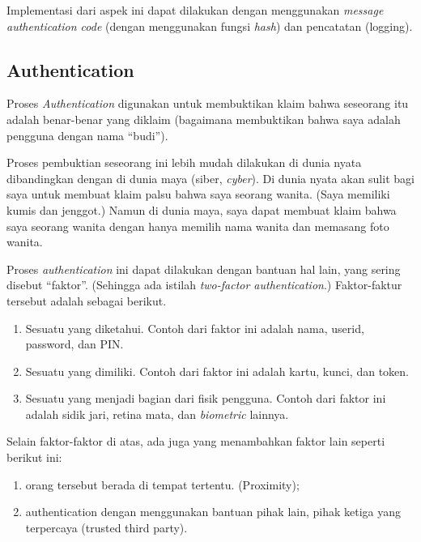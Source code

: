 Implementasi dari aspek ini dapat dilakukan dengan menggunakan
{\em message authentication code} (dengan menggunakan fungsi {\em hash})
dan pencatatan (logging).


\subsection{Authentication}
Proses {\em Authentication} digunakan untuk membuktikan klaim
bahwa seseorang itu adalah benar-benar yang diklaim
(bagaimana membuktikan bahwa saya adalah pengguna dengan nama ``budi'').

Proses pembuktian seseorang ini lebih mudah dilakukan di dunia nyata
dibandingkan dengan di dunia maya (siber, {\em cyber}).
Di dunia nyata akan sulit bagi saya untuk membuat klaim palsu bahwa
saya seorang wanita. (Saya memiliki kumis dan jenggot.)
Namun di dunia maya, saya dapat membuat klaim bahwa saya
seorang wanita dengan hanya memilih nama wanita dan memasang foto
wanita.

Proses {\em authentication} ini dapat dilakukan dengan bantuan
hal lain, yang sering disebut ``faktor''. 
(Sehingga ada istilah {\em two-factor authentication}.)
Faktor-faktur tersebut adalah sebagai berikut.

\begin{enumerate}
\item Sesuatu yang diketahui.
   Contoh dari faktor ini adalah nama, userid, password, dan PIN.
\item Sesuatu yang dimiliki.
   Contoh dari faktor ini adalah kartu, kunci, dan token.
\item Sesuatu yang menjadi bagian dari fisik pengguna.
   Contoh dari faktor ini adalah sidik jari, retina mata,
   dan {\em biometric} lainnya.
\end{enumerate}

Selain faktor-faktor di atas, ada juga yang menambahkan faktor lain
seperti berikut ini:
\begin{enumerate}
\item orang tersebut berada di tempat tertentu. (Proximity);
\item authentication dengan menggunakan bantuan pihak lain,
   pihak ketiga yang terpercaya (trusted third party).
\end{enumerate}
